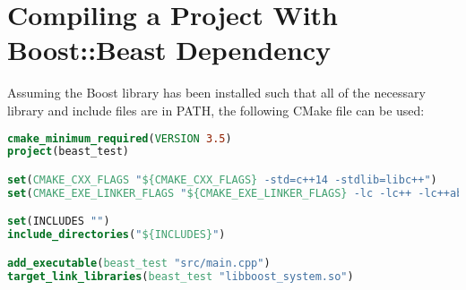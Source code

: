 \section{Compiling a Project With Boost::Beast Dependency}

Assuming the Boost library has been installed such that all of the necessary library and include files are in PATH, the following CMake file can be used:
\begin{lstlisting}[language=CMake]
cmake_minimum_required(VERSION 3.5)
project(beast_test)

set(CMAKE_CXX_FLAGS "${CMAKE_CXX_FLAGS} -std=c++14 -stdlib=libc++")
set(CMAKE_EXE_LINKER_FLAGS "${CMAKE_EXE_LINKER_FLAGS} -lc -lc++ -lc++abi -lpthread")

set(INCLUDES "")
include_directories("${INCLUDES}")

add_executable(beast_test "src/main.cpp")
target_link_libraries(beast_test "libboost_system.so")
\end{lstlisting}

